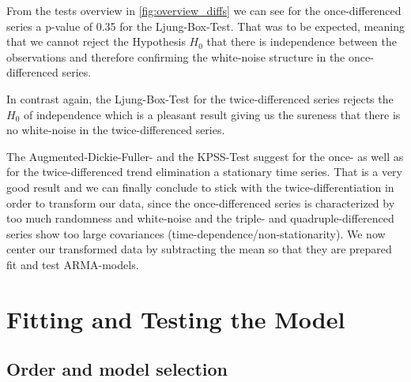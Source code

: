 \documentclass[11pt,a4paper]{article}
\begin{document}
From the tests overview in \cref{fig:overview_diffs} we can see for the once-differenced series a p-value of 0.35 for the Ljung-Box-Test.
That was to be expected, meaning that we cannot reject the Hypothesis $H_0$ that there is independence between the observations \citep{LjungBox78} and therefore confirming the white-noise structure in the once-differenced series.

In contrast again, the Ljung-Box-Test for the twice-differenced series rejects the $H_0$ of independence which is a pleasant result giving us the sureness that there is no white-noise in the twice-differenced series.

The Augmented-Dickie-Fuller- and the KPSS-Test suggest for the once- as well as for the twice-differenced trend elimination a stationary time series.
That is a very good result and we can finally conclude to stick with the twice-differentiation in order to transform our data, since the once-differenced series is characterized by too much randomness and white-noise and the triple- and quadruple-differenced series show too large covariances (time-dependence/non-stationarity).
We now center our transformed data by subtracting the mean so that they are prepared fit and test ARMA-models.



\section{Fitting and Testing the Model}
\label{sec:FitTestModel}

\subsection{Order and model selection}
\end{document}
